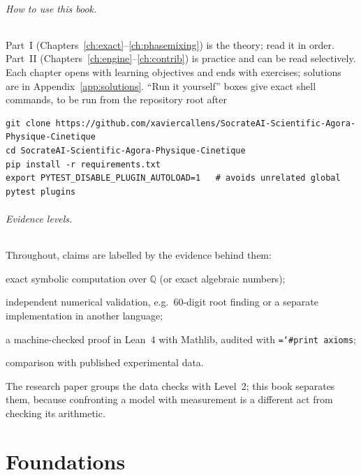 \documentclass[11pt,a4paper,openany]{book}
\newcommand{\code}[1]{\texttt{\hyphenchar\font=`\-\relax #1}}
\newcommand{\Q}{\mathbb{Q}}
\theoremstyle{definition}
\theoremstyle{plain}
\begin{document}
\paragraph{How to use this book.} Part~I (Chapters~\ref{ch:exact}--\ref{ch:phasemixing}) is the
theory; read it in order. Part~II (Chapters~\ref{ch:engine}--\ref{ch:contrib}) is practice and can
be read selectively. Each chapter opens with learning objectives and ends with exercises; solutions
are in Appendix~\ref{app:solutions}. ``Run it yourself'' boxes give exact shell commands, to be
run from the repository root after
\begin{verbatim}
git clone https://github.com/xaviercallens/SocrateAI-Scientific-Agora-Physique-Cinetique
cd SocrateAI-Scientific-Agora-Physique-Cinetique
pip install -r requirements.txt
export PYTEST_DISABLE_PLUGIN_AUTOLOAD=1   # avoids unrelated global pytest plugins
\end{verbatim}

\paragraph{Evidence levels.} Throughout, claims are labelled by the evidence behind them:
\begin{description}[leftmargin=2.2em,style=nextline]
  \item[Level 1] exact symbolic computation over $\Q$ (or exact algebraic numbers);
  \item[Level 2] independent numerical validation, e.g.\ 60-digit root finding or a separate
        implementation in another language;
  \item[Level 3] a machine-checked proof in Lean~4 with Mathlib, audited with \code{\#print axioms};
  \item[Level 4] comparison with published experimental data.
\end{description}
The research paper groups the data checks with Level~2; this book separates them, because
confronting a model with measurement is a different act from checking its arithmetic.

\tableofcontents

\mainmatter

\part{Foundations}
\end{document}
